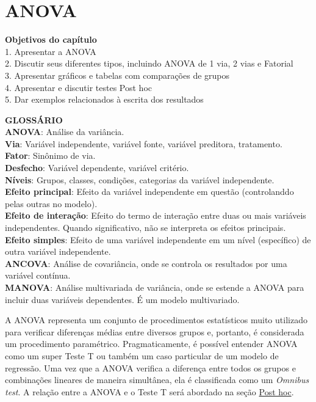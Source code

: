 \documentclass[
]{book}
\newenvironment{objectives}{
  \definecolor{shadecolor}{rgb}{0, 0, 0}  %
  \color{white}
  \begin{shaded}}
 {\end{shaded}}
\begin{document}
\hypertarget{anova}{%
\chapter{ANOVA}\label{anova}}

\begin{objectives}
\textbf{Objetivos do capítulo}\\
1. Apresentar a ANOVA\\
2. Discutir seus diferentes tipos, incluindo ANOVA de 1 via, 2 vias e Fatorial\\
3. Apresentar gráficos e tabelas com comparações de grupos\\
4. Apresentar e discutir testes Post hoc\\
5. Dar exemplos relacionados à escrita dos resultados

\end{objectives}

\textbf{GLOSSÁRIO}\\
\textbf{ANOVA}: Análise da variância.\\
\textbf{Via}: Variável independente, variável fonte, variável preditora, tratamento.\\
\textbf{Fator}: Sinônimo de via.\\
\textbf{Desfecho}: Variável dependente, variável critério.\\
\textbf{Níveis}: Grupos, classes, condições, categorias da variável independente.\\
\textbf{Efeito principal}: Efeito da variável independente em questão (controlanddo pelas outras no modelo).\\
\textbf{Efeito de interação}: Efeito do termo de interação entre duas ou mais variáveis independentes. Quando significativo, não se interpreta os efeitos principais.\\
\textbf{Efeito simples}: Efeito de uma variável independente em um nível (específico) de outra variável independente.\\
\textbf{ANCOVA}: Análise de covariância, onde se controla os resultados por uma variável contínua.\\
\textbf{MANOVA}: Análise multivariada de variância, onde se estende a ANOVA para incluir duas variáveis dependentes. É um modelo multivariado.

A ANOVA representa um conjunto de procedimentos estatísticos muito utilizado para verificar diferenças médias entre diversos grupos e, portanto, é considerada um procedimento paramétrico. Pragmaticamente, é possível entender ANOVA como um super Teste T ou também um caso particular de um modelo de regressão. Uma vez que a ANOVA verifica a diferença entre todos os grupos e combinações lineares de maneira simultânea, ela é classificada como um \emph{Omnibus test}. A relação entre a ANOVA e o Teste T será abordado na seção \protect\hyperlink{post-hoc}{Post hoc}.
\end{document}
